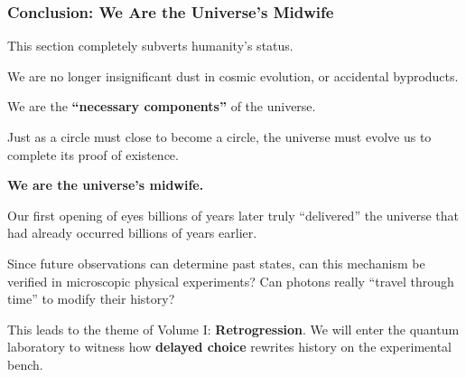 \subsubsection{Conclusion: We Are the Universe's Midwife}

This section completely subverts humanity's status.

We are no longer insignificant dust in cosmic evolution, or accidental byproducts.

We are the \textbf{``necessary components''} of the universe.

Just as a circle must close to become a circle, the universe must evolve us to complete its proof of existence.

\textbf{We are the universe's midwife.}

Our first opening of eyes billions of years later truly ``delivered'' the universe that had already occurred billions of years earlier.

Since future observations can determine past states, can this mechanism be verified in microscopic physical experiments? Can photons really ``travel through time'' to modify their history?

This leads to the theme of Volume I: \textbf{Retrogression}. We will enter the quantum laboratory to witness how \textbf{delayed choice} rewrites history on the experimental bench.

